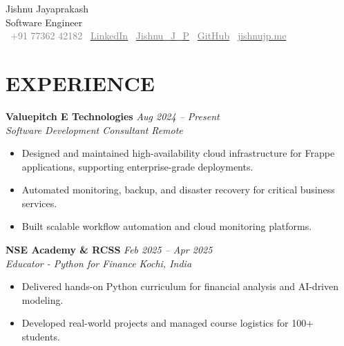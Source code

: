 \documentclass[11pt,a4paper]{article}
\begin{document}
\begin{center}
    {\LARGE Jishnu Jayaprakash} \\
    Software Engineer \\
    \faWhatsapp~\textcolor{gray}{+91 77362 42182} \quad
    \faLinkedinSquare~\href{https://www.linkedin.com/in/jishnu-jayaprakash-813488156}{\textcolor{gray}{LinkedIn}} \quad
    \faTwitter~\href{https://x.com/Jishnu_J_P}{\textcolor{gray}{Jishnu\_J\_P}} \quad
    \faGithub~\href{https://github.com/jishnujp}{\textcolor{gray}{GitHub}} \quad
    \faGlobe~\href{https://jishnujp.me}{\textcolor{gray}{jishnujp.me}} \quad

\end{center}

\vspace{0.5em}

\section*{EXPERIENCE}

\textbf{Valuepitch E Technologies} \hfill \textit{Aug 2024 -- Present} \\
\textit{Software Development Consultant} \hfill \textit{Remote} \\
\begin{itemize}[leftmargin=*]
    \item Designed and maintained high-availability cloud infrastructure for Frappe applications, supporting enterprise-grade deployments.
    \item Automated monitoring, backup, and disaster recovery for critical business services.
    \item Built scalable workflow automation and cloud monitoring platforms.
\end{itemize}

\textbf{NSE Academy \& RCSS} \hfill \textit{Feb 2025 -- Apr 2025} \\
\textit{Educator - Python for Finance} \hfill \textit{Kochi, India} \\
\begin{itemize}[leftmargin=*]
    \item Delivered hands-on Python curriculum for financial analysis and AI-driven modeling.
    \item Developed real-world projects and managed course logistics for 100+ students.
\end{itemize}
\end{document}
